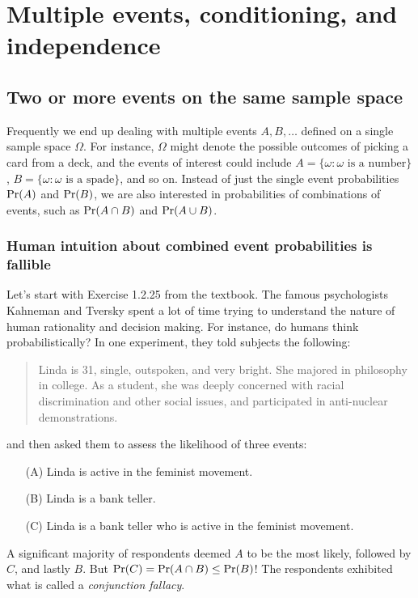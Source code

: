 \chapter{Multiple events, conditioning, and independence}

\section{Two or more events on the same sample space}

Frequently we end up dealing with multiple events $A,B,\ldots$ defined
on a single sample space $\Omega$. For instance, $\Omega$ might denote
the possible outcomes of picking a card from a deck, and the events of
interest could include $A = \{\omega: \mbox{$\omega$ is a number}\}$,
$B = \{\omega: \mbox{$\omega$ is a spade}\}$, and so on. Instead of
just the single event probabilities $\mbox{\rm Pr}(A)$ and $\mbox{\rm Pr}(B)$, we are also
interested in probabilities of combinations of events, such as $\mbox{\rm Pr}(A
\cap B)$ and $\mbox{\rm Pr}(A \cup B)$.

\subsection{Human intuition about combined event probabilities is fallible}

Let's start with Exercise 1.2.25 from the textbook. The famous
psychologists Kahneman and Tversky spent a lot of time trying to
understand the nature of human rationality and decision making. For
instance, do humans think probabilistically? In one experiment, they
told subjects the following:
\begin{quote}
Linda is 31, single, outspoken, and very bright. She majored in philosophy in college. As a student, she was deeply concerned with racial discrimination and other social issues, and participated in anti-nuclear demonstrations.
\end{quote}
and then asked them to assess the likelihood of three events:
\begin{enumerate}
\item[(A)] Linda is active in the feminist movement.
\item[(B)] Linda is a bank teller.
\item[(C)] Linda is a bank teller who is active in the feminist movement.
\end{enumerate}
A significant majority of respondents deemed $A$ to be the most likely, followed by $C$, and lastly $B$. But $\mbox{\rm Pr}(C) = \mbox{\rm Pr}(A \cap B) \leq \mbox{\rm Pr}(B)$! The respondents exhibited what is called a {\it conjunction fallacy}.

